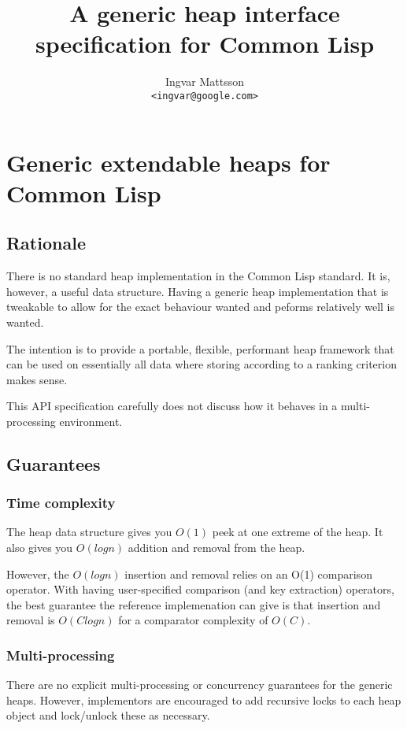 \documentclass{report}
\begin{document}
\title{A generic heap interface specification for Common Lisp}
\author{Ingvar Mattsson \\ {\tt <ingvar@google.com>}}
\maketitle

\chapter{Generic extendable heaps for Common Lisp}
\section{Rationale}
 There is no standard heap implementation in the Common Lisp
 standard. It is, however, a useful data structure. Having a generic
 heap implementation that is tweakable to allow for the exact
 behaviour wanted and peforms relatively well is wanted.

 The intention is to provide a portable, flexible, performant heap
 framework that can be used on essentially all data where storing
 according to a ranking criterion makes sense.

 This API specification carefully does not discuss how it behaves in a
 multi-processing environment.

\section{Guarantees}
\subsection{Time complexity}
The heap data structure gives you $O(1)$ peek at one extreme of the
heap. It also gives you $O(log n)$ addition and removal from the heap.

However, the $O(log n)$ insertion and removal relies on an O(1)
comparison operator. With having user-specified comparison (and key
extraction) operators, the best guarantee the reference implemenation
can give is that insertion and removal is $O(C log n)$ for a
comparator complexity of $O(C)$.

\subsection{Multi-processing}
There are no explicit multi-processing or concurrency guarantees for
the generic heaps. However, implementors are encouraged to add
recursive locks to each heap object and lock/unlock these as
necessary.
\end{document}
